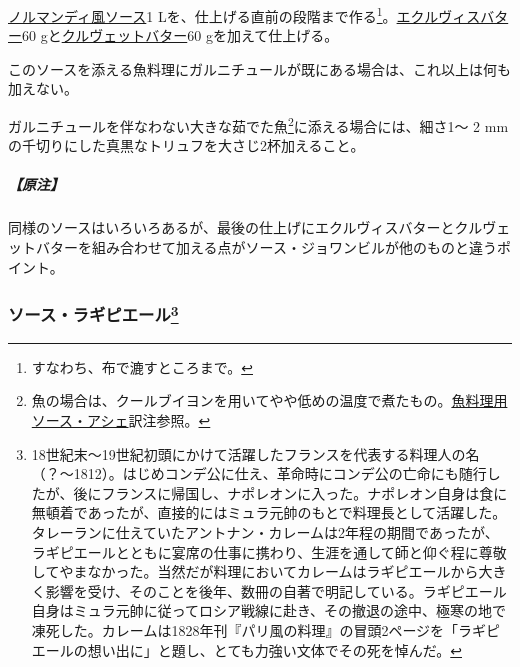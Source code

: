 \begin{recette}
\protect\hyperlink{sauce-normande}{ノルマンディ風ソース}1
Lを、仕上げる直前の段階まで作る\footnote{すなわち、布で漉すところまで。}。\protect\hyperlink{beurre-d-ecrevisse}{エクルヴィスバター}60
gと\protect\hyperlink{}{クルヴェットバター}60 gを加えて仕上げる。

このソースを添える魚料理にガルニチュールが既にある場合は、これ以上は何も加えない。

ガルニチュールを伴なわない大きな茹でた魚\footnote{魚の場合は、クールブイヨンを用いてやや低めの温度で煮たもの。\protect\hyperlink{sauce-hachee-maigre}{魚料理用ソース・アシェ}訳注参照。}に添える場合には、細さ1〜
2 mmの千切りにした真黒なトリュフを大さじ2杯加えること。

\hypertarget{nota-sauce-joinville}{%
\subparagraph{【原注】}\label{nota-sauce-joinville}}

同様のソースはいろいろあるが、最後の仕上げにエクルヴィスバターとクルヴェットバターを組み合わせて加える点がソース・ジョワンビルが他のものと違うポイント。

\hypertarget{sauce-laguipiere}{%
\subsubsection[ソース・ラギピエール]{\texorpdfstring{ソース・ラギピエール\footnote{18世紀末〜19世紀初頭にかけて活躍したフランスを代表する料理人の名（？〜1812）。はじめコンデ公に仕え、革命時にコンデ公の亡命にも随行したが、後にフランスに帰国し、ナポレオンに入った。ナポレオン自身は食に無頓着であったが、直接的にはミュラ元帥のもとで料理長として活躍した。タレーランに仕えていたアントナン・カレームは2年程の期間であったが、ラギピエールとともに宴席の仕事に携わり、生涯を通して師と仰ぐ程に尊敬してやまなかった。当然だが料理においてカレームはラギピエールから大きく影響を受け、そのことを後年、数冊の自著で明記している。ラギピエール自身はミュラ元帥に従ってロシア戦線に赴き、その撤退の途中、極寒の地で凍死した。カレームは1828年刊『パリ風の料理』の冒頭2ページを「ラギピエールの想い出に」と題し、とても力強い文体でその死を悼んだ。}}{ソース・ラギピエール}}\label{sauce-laguipiere}}




\end{recette}
